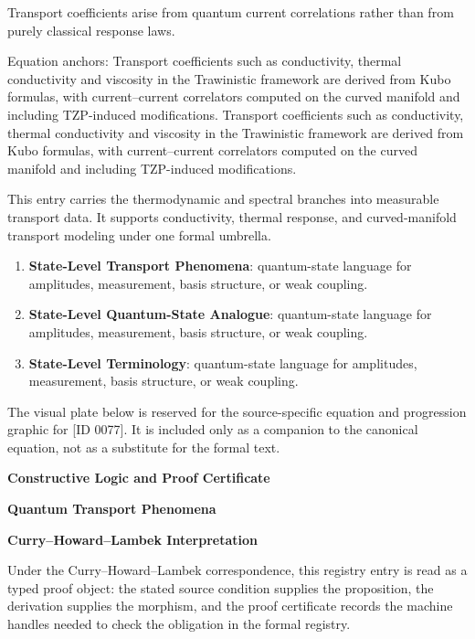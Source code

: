 Transport coefficients arise from quantum current correlations rather than from purely classical response laws.

Equation anchors: Transport coefficients such as conductivity, thermal conductivity and viscosity in the Trawinistic framework are derived from Kubo formulas, with current--current correlators computed on the curved manifold and including TZP-induced modifications. Transport coefficients such as conductivity, thermal conductivity and viscosity in the Trawinistic framework are derived from Kubo formulas, with current--current correlators computed on the curved manifold and including TZP-induced modifications.

This entry carries the thermodynamic and spectral branches into measurable transport data. It supports conductivity, thermal response, and curved-manifold transport modeling under one formal umbrella.
\endgroup

\begingroup\footnotesize\sloppy
\begin{enumerate}[leftmargin=1.35em,itemsep=1pt,topsep=1pt,parsep=0pt]
\item \textbf{State-Level Transport Phenomena}: quantum-state language for amplitudes, measurement, basis structure, or weak coupling.
\item \textbf{State-Level Quantum-State Analogue}: quantum-state language for amplitudes, measurement, basis structure, or weak coupling.
\item \textbf{State-Level Terminology}: quantum-state language for amplitudes, measurement, basis structure, or weak coupling.
\end{enumerate}
\endgroup

\begingroup\footnotesize\sloppy
The visual plate below is reserved for the source-specific equation and progression graphic for [ID 0077]. It is included only as a companion to the canonical equation, not as a substitute for the formal text.
\par\endgroup
\ifTZPDarkEdition
{}
\fi

\clearpage
\begingroup\tzpsupportsetup
\noindent\textbf{\fontsize{10.8pt}{12.8pt}\selectfont [ID 0077] Constructive Logic and Proof Certificate}\par
\noindent\textbf{\fontsize{10pt}{12pt}\selectfont Quantum Transport Phenomena}\par
\vspace{0.45em}
\begingroup
\footnotesize
\setlength{\parskip}{0.22em}
\setlength{\parindent}{0pt}
\noindent\textbf{Curry--Howard--Lambek Interpretation}\par
Under the Curry--Howard--Lambek correspondence, this registry entry is read as a typed proof
object: the stated source condition supplies the proposition, the derivation supplies the
morphism, and the proof certificate records the machine handles needed to check the obligation
in the formal registry.

